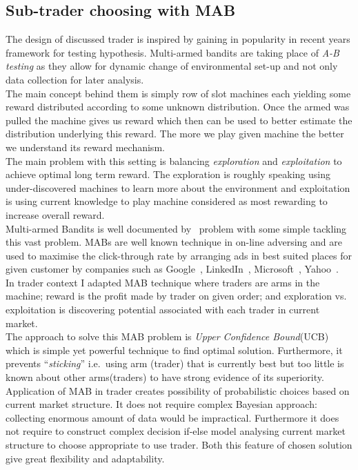 \documentclass{llncs}
\begin{document}
\subsection{Sub-trader choosing with MAB}
The design of discussed trader is inspired by gaining in popularity in recent years framework for testing hypothesis. Multi-armed bandits are taking place of \emph{A-B testing} as they allow for dynamic change of environmental set-up and not only data collection for later analysis.\\
The main concept behind them is simply row of slot machines each yielding some reward distributed according to some unknown distribution. Once the armed was pulled the machine gives us reward which then can be used to better estimate the distribution underlying this reward. The more we play given machine the better we understand its reward mechanism.\\
The main problem with this setting is balancing \emph{exploration} and \emph{exploitation} to achieve optimal long term reward. The exploration is roughly speaking using under-discovered machines to learn more about the environment and exploitation is using current knowledge to play machine considered as most rewarding to increase overall reward.\\
Multi-armed Bandits is well documented by~\cite{berry+firstedt,gittins+glazebrook+weber} problem with some simple tackling this vast problem. MABs are well known technique in on-line adversing and are used to maximise the click-through rate by arranging ads in best suited places for given customer by companies such as Google~\cite{AYPSze12,ASMB:ASMB874}, LinkedIn~\cite{Tang:2013:AAF:2505515.2514700}, Microsoft~\cite{graepel2010web}, Yahoo~\cite{Li:2010:CAP:1772690.1772758}.\\

In trader context I adapted MAB technique where traders are arms in the machine; reward is the profit made by trader on given order; and exploration vs. exploitation is discovering potential associated with each trader in current market.\\
The approach to solve this MAB problem is \emph{Upper Confidence Bound}(UCB)~\cite{white2012bandit} which is simple yet powerful technique to find optimal solution. Furthermore, it prevents ``\emph{sticking}'' i.e.\ using arm (trader) that is currently best but too little is known about other arms(traders) to  have strong evidence of its superiority.\\

Application of MAB in trader creates possibility of probabilistic choices based on current market structure. It does not require complex Bayesian approach: collecting enormous amount of data would be impractical. Furthermore it does not require to construct complex decision if-else model analysing current market structure to choose appropriate to use trader. Both this feature of chosen solution give great flexibility and adaptability.\\
\end{document}
